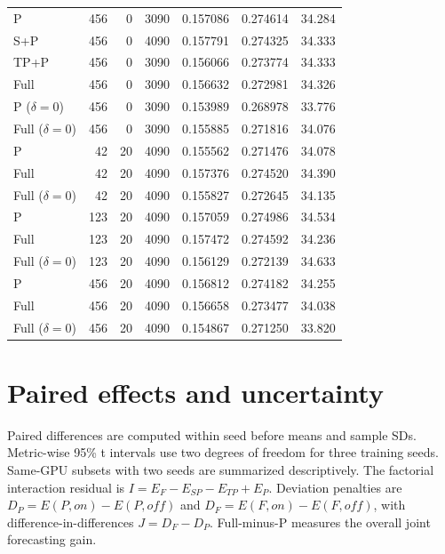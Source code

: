 \documentclass[a4paper,10pt]{article}
\begin{document}
\begin{longtable}{lrrrrrr}
P & 456 & 0 & 3090 & 0.157086 & 0.274614 & 34.284 \\

S+P & 456 & 0 & 4090 & 0.157791 & 0.274325 & 34.333 \\

TP+P & 456 & 0 & 3090 & 0.156066 & 0.273774 & 34.333 \\

Full & 456 & 0 & 3090 & 0.156632 & 0.272981 & 34.326 \\

P ($\delta=0$) & 456 & 0 & 3090 & 0.153989 & 0.268978 & 33.776 \\

Full ($\delta=0$) & 456 & 0 & 3090 & 0.155885 & 0.271816 & 34.076 \\

P & 42 & 20 & 4090 & 0.155562 & 0.271476 & 34.078 \\

Full & 42 & 20 & 4090 & 0.157376 & 0.274520 & 34.390 \\

Full ($\delta=0$) & 42 & 20 & 4090 & 0.155827 & 0.272645 & 34.135 \\

P & 123 & 20 & 4090 & 0.157059 & 0.274986 & 34.534 \\

Full & 123 & 20 & 4090 & 0.157472 & 0.274592 & 34.236 \\

Full ($\delta=0$) & 123 & 20 & 4090 & 0.156129 & 0.272139 & 34.633 \\

P & 456 & 20 & 4090 & 0.156812 & 0.274182 & 34.255 \\

Full & 456 & 20 & 4090 & 0.156658 & 0.273477 & 34.038 \\

Full ($\delta=0$) & 456 & 20 & 4090 & 0.154867 & 0.271250 & 33.820 \\

\bottomrule
\end{longtable}\endgroup

\section{Paired effects and uncertainty}
Paired differences are computed within seed before means and sample SDs. Metric-wise 95\% t intervals use two degrees of freedom for three training seeds. Same-GPU subsets with two seeds are summarized descriptively. The factorial interaction residual is $I=E_F-E_{SP}-E_{TP}+E_P$. Deviation penalties are $D_P=E(P,on)-E(P,off)$ and $D_F=E(F,on)-E(F,off)$, with difference-in-differences $J=D_F-D_P$. Full-minus-P measures the overall joint forecasting gain.
\end{document}
